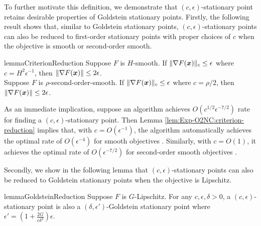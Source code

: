
To further motivate this definition, we demonstrate that $(c,\epsilon)$-stationary point retains desirable properties of Goldstein stationary points. Firstly, the following result shows that, similar to Goldstein stationary points, $(c,\epsilon)$-stationary points can also be reduced to first-order stationary points with proper choices of $c$ when the objective is smooth or second-order smooth. 

\begin{restatable}{lemma}{CriterionReduction}
\label{lem:Exp-O2NC:criterion-reduction}
Suppose $F$ is $H$-smooth. 
If $\|\nabla F({\boldsymbol{x}})\|_c\le\epsilon$ where $c=H^2\epsilon^{-1}$, then $\|\nabla F({\boldsymbol{x}})\|\le 2\epsilon$. \\
Suppose $F$ is $\rho$-second-order-smooth. 
If $\|\nabla F({\boldsymbol{x}})\|_c\le\epsilon$ where $c=\rho/2$, then $\|\nabla F({\boldsymbol{x}})\|\le 2\epsilon$.
\end{restatable}

As an immediate implication, suppose an algorithm achieves $O(c^{1/2}\epsilon^{-7/2})$ rate for finding a $(c,\epsilon)$-stationary point. Then Lemma \ref{lem:Exp-O2NC:criterion-reduction} implies that, with $c=O(\epsilon^{-1})$, the algorithm automatically achieves the optimal rate of $O(\epsilon^{-4})$ for smooth objectives \cite{arjevani2019lower}. Similarly, with $c=O(1)$, it achieves the optimal rate of $O(\epsilon^{-7/2})$ for second-order smooth objectives \cite{arjevani2020second}. 

Secondly, we show in the following lemma that $(c,\epsilon)$-stationary points can also be reduced to Goldstein stationary points when the objective is Lipschitz.

\begin{restatable}{lemma}{GoldsteinReduction}
\label{lem:Exp-O2NC:goldstein-reduction}
Suppose $F$ is $G$-Lipschitz. For any $c,\epsilon,\delta>0$, a $(c,\epsilon)$-stationary point is also a $(\delta,\epsilon')$-Goldstein stationary point where $\epsilon' = (1+\frac{2G}{c\delta^2})\epsilon$.
\end{restatable}

